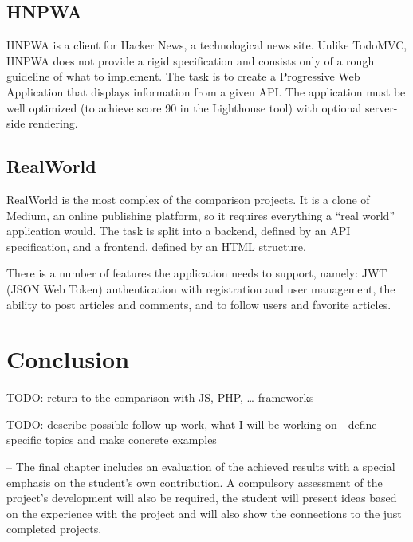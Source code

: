 \documentclass[english,odsaz]{fitthesis}
\begin{document}
\section{HNPWA}
\label{sec:org6eae236}
HNPWA \cite{hnpwa} is a client for Hacker News, a technological news site. Unlike TodoMVC,
HNPWA does not provide a rigid specification and consists only of a rough
guideline of what to implement. The task is to create a Progressive Web
Application that displays information from a given API. The application must be
well optimized (to achieve score 90 in the Lighthouse tool) with optional
server-side rendering.

\section{RealWorld}
\label{sec:orgf81b37c}
RealWorld \cite{realworld} is the most complex of the comparison projects. It is a clone of
Medium, an online publishing platform, so it requires everything a ``real world''
application would. The task is split into a backend, defined by an API
specification, and a frontend, defined by an HTML structure.

There is a number of features the application needs to support, namely: JWT
(JSON Web Token) authentication with registration and user management, the
ability to post articles and comments, and to follow users and favorite articles.

\chapter{Conclusion}
\label{sec:org9d1c383}
TODO: return to the comparison with JS, PHP, \ldots{} frameworks

TODO: describe possible follow-up work, what I will be working on - define
specific topics and make concrete examples

-- The final chapter includes an evaluation of the achieved results with a special
emphasis on the student's own contribution. A compulsory assessment of the
project's development will also be required, the student will present ideas
based on the experience with the project and will also show the connections to
the just completed projects. \cite{Pravidla}

\makeatletter
\def\@openbib@code{\addcontentsline{toc}{chapter}{Bibliography}}
\makeatother

\end{document}
